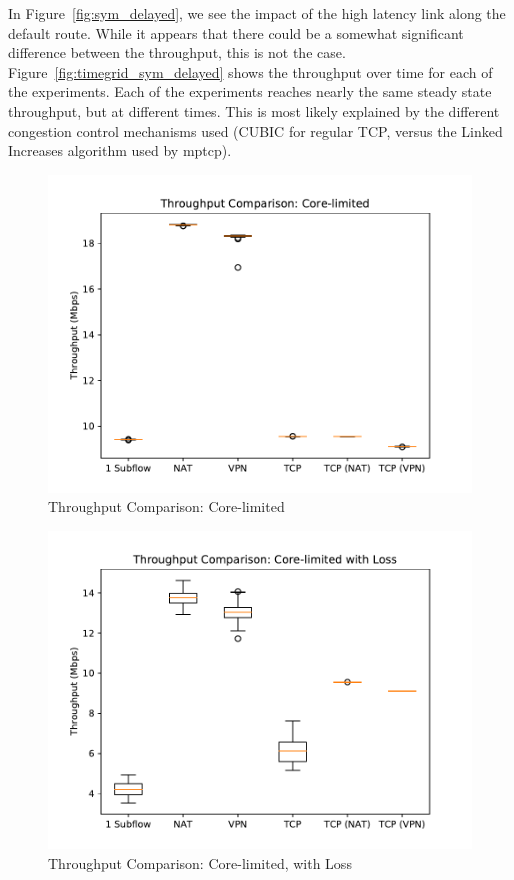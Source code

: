 \documentclass{cwru}
\begin{document}
In Figure~\ref{fig:sym_delayed}, we see the impact of the high latency link
along the default route. While it appears that there could be a somewhat
significant difference between the throughput, this is not the case.
Figure~\ref{fig:timegrid_sym_delayed} shows the throughput over time for
each of the experiments. Each of the experiments reaches nearly the same steady
state throughput, but at different times. This is most likely explained by the
different congestion control mechanisms used (CUBIC for regular TCP, versus the
Linked Increases algorithm used by \ac{mptcp}).

\begin{figure}[p]
  \centering
  \includegraphics[height=0.45\textheight]{figures/easy.pdf}
  \caption{Throughput Comparison: Core-limited}
  \label{fig:easy}
\end{figure}

\begin{figure}[p]
  \centering
  \includegraphics[height=0.45\textheight]{figures/lossy.pdf}
  \caption{Throughput Comparison: Core-limited, with Loss}
  \label{fig:lossy}
\end{figure}
\end{document}
